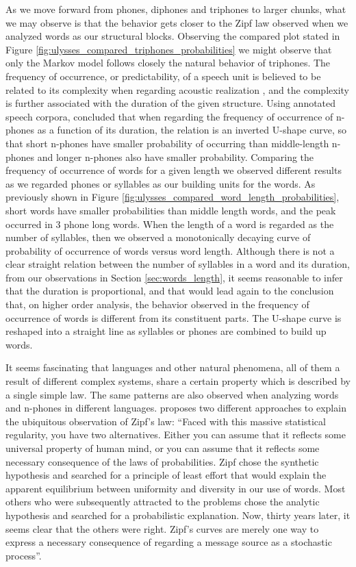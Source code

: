 As we move forward from phones, diphones and triphones to larger chunks, 
what we may observe is that the behavior gets closer to
the Zipf law observed when we analyzed words as our structural blocks. 
Observing the compared plot stated in Figure \ref{fig:ulysses_compared_triphones_probabilities}
we might observe that only the Markov model follows closely the natural behavior of triphones.
The frequency of occurrence, or predictability, of a speech unit is believed to be related to
its complexity when regarding acoustic realization \citep{jurafsky2001}, and the complexity is 
further associated with the duration of the given structure. Using annotated speech corpora,
\citet{jurafsky2001} concluded that when regarding the frequency of occurrence of n-phones as a function of its
duration, the relation is an inverted U-shape curve, so that short n-phones have smaller 
probability of occurring than middle-length n-phones and longer n-phones also have smaller 
probability. Comparing the frequency of occurrence of words for a given length we 
observed different results as we regarded phones or syllables as our building units for the words.
As previously shown in Figure \ref{fig:ulysses_compared_word_length_probabilities},
short words have smaller probabilities than middle length words, and the peak occurred in 3 phone
long words. When the length of a word is regarded as the number of syllables, then we
observed a monotonically decaying curve of probability of occurrence of words versus 
word length. Although there is not a clear straight relation between the number of syllables in a word
and its duration, from our observations in Section \ref{sec:words_length}, 
it seems reasonable to infer that the duration is proportional,
and that would lead again to the conclusion that, on higher order analysis, the 
behavior observed in the frequency of occurrence of words is different from its constituent parts.
The U-shape curve is reshaped into a straight line as syllables or phones are combined to build up
words.

It seems fascinating that languages and other natural phenomena, all of them a result of 
different complex systems, share a certain property which is described by a single simple law.
The same patterns are also observed when analyzing words and n-phones in different languages.
\cite{miller1965} proposes two different approaches to explain the ubiquitous observation of
Zipf's law: ``Faced with this massive statistical regularity, you have two alternatives.
Either you can assume that it reflects some universal property of human
mind, or you can assume that it reflects some necessary consequence of
the laws of probabilities. Zipf chose the synthetic hypothesis and searched
for a principle of least effort that would explain the apparent equilibrium
between uniformity and diversity in our use of words. Most others who
were subsequently attracted to the problems chose the analytic hypothesis
and searched for a probabilistic explanation. Now, thirty years later, it
seems clear that the others were right. Zipf's curves are merely one way
to express a necessary consequence of regarding a message source as a
stochastic process''.

